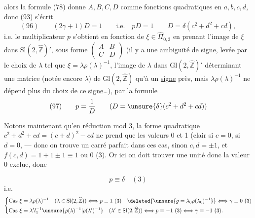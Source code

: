 alors la formule (78) donne $A,B,C,D$ comme
fonctions quadratiques en $a,b,c,d$, 
donc (93) s'écrit
\[
(96)\qquad\boxed{(2\gamma+1)D=1\qquad\text{i.e.}\quad pD=1}
\qquad D=\delta(c^2+d^2+cd),
\]
i.e. le multiplicateur $p$ s'obtient en fonction
de $\xi\in\widehat\Pi_{0,3}$ en prenant l'image
de $\xi$ dans $\mathrm{Sl}(2,\widehat{\mathbb Z})'$, sous forme $\begin{pmatrix}A&B\\C&D\end{pmatrix}$
(il y a une ambiguïté de signe, levée par le
choix de $\lambda$ tel que $\xi=\lambda\rho(\lambda)^{-1}$, l'image
de $\lambda$ dans $\mathrm{Gl}(2,\widehat{\mathbb Z})'$  déterminant une
matrice (notée encore $\lambda$) de $\mathrm{Gl}(2,\widehat{\mathbb Z})$ qu'à un
\uline{signe} près, mais $\lambda\rho(\lambda)^{-1}$ ne dépend plus du
choix de ce \uline{signe}\ldots), par la formule
\[
(97)\qquad p=\frac1D\qquad (D=\unsure{\delta}(c^2+d^2+cd))
\]

Notons maintenant qu'en réduction mod 3,
la forme quadratique $c^2+d^2+cd=(c+d)^2-cd$
ne prend que les valeurs 0 et 1 (clair si $c=0$,
si $d=0$, 
--- donc on
trouve un carré parfait dans ces  cas, sinon
$c,d=\pm1$, et $f(c,d)=1+1\pm1\equiv1$ ou $0$  (3). Or ici
on doit trouver une unité donc la valeur 0 exclue,
donc



\[
p\equiv\delta\quad(3)
\]
i.e.
\[
\left\{\begin{aligned}
\text{Cas }\xi&=\lambda\rho(\lambda)^{-1}\quad(\lambda\in\mathrm{Sl}(2,\widehat{\mathbb Z}))
\Longleftrightarrow p\equiv1\ (3)\quad\deleted{\unsure{g=\lambda_0\rho(\lambda_0)^{-1}}}\Longleftrightarrow\gamma\equiv0\ (3)\\
\text{Cas }\xi&=\lambda'l_1^{-1}\unsure{\rho(\lambda)^{-1}|\rho(\lambda')^{-1}}\quad(\lambda'\in\mathrm{Sl}(2,\widehat{\mathbb Z}))
\Longleftrightarrow p\equiv-1\ (3)\Longleftrightarrow\gamma\equiv-1\ (3).
\end{aligned}\right.
\]


